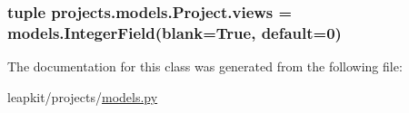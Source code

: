 \hypertarget{classprojects_1_1models_1_1_project_a5ef6dd18bd6267968bbfafdb6e0e6143}{
\subsubsection[{views}]{\setlength{\rightskip}{0pt plus 5cm}tuple projects.\-models.\-Project.\-views = models.\-Integer\-Field(blank=True, default=0)\hspace{0.3cm}{\ttfamily [static]}}}\label{classprojects_1_1models_1_1_project_a5ef6dd18bd6267968bbfafdb6e0e6143}


The documentation for this class was generated from the following file\-:\begin{DoxyCompactItemize}
\item 
leapkit/projects/\hyperlink{projects_2models_8py}{models.\-py}\end{DoxyCompactItemize}
